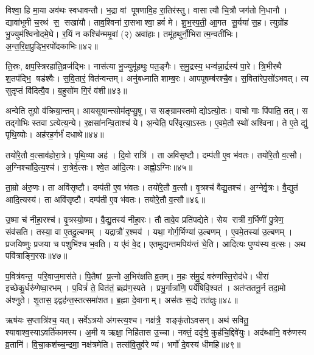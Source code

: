 विश्वा॒ हि मा॒या अव॑थः स्वधावन्तौ। 
भ॒द्रा वां पूषणावि॒ह रा॒तिर॑स्तु। वासात्यौ चि॒त्रौ जग॑तो नि॒धानौ। 
द्यावा॑भूमी च॒रथ॑ स॒ सखा॑यौ। ताव॒श्विना॑ रा॒सभाश्वा॒ हवं॑ मे। 
शु॒भ॒स्प॒ती॒ आ॒गत सू॒र्यया॑ स॒ह। त्युग्रो॑ह भु॒ज्युम॑श्विनोदमे॒घे। 
र॒यिं न कश्चि॑न्ममृ॒वां (२) अवा॑हाः। तमू॑हथुर्नौ॒भिरात्म॒न्वती॑भिः। 
अ॒न्त॒रि॒क्ष॒प्रुड्भि॒रपो॑दकाभिः॥४२॥


ति॒स्रः, क्षप॒स्त्रिरहा॑ति॒व्रज॑द्भिः। नास॑त्या भु॒ज्युमू॑हथुः पत॒ङ्गैः। 
स॒मु॒द्रस्य॒ धन्व॑न्ना॒र्द्रस्य॑ पा॒रे। त्रि॒भीरथै श॒तप॑द्भि॒ षड॑श्वैः। 
स॒वि॒तारं॒ वित॑न्वन्तम्‌। अनु॑बध्नाति शाम्ब॒रः। आपपू\ur{}षम्ब॑रश्चै॒व। 
स॒विता॑रेप॒सो॑ऽभवत्‌। त्य सुतृप्तं वि॑दित्वै॒व। ब॒हुसो॑म गि॒रं व॑शी॥४३॥

अन्वेति तुग्रो व॑क्रिया॒न्तम्‌। आयसूयान्त्सोम॑तृप्सु॒षु। स \linebreak सङ्ग्रामस्तमोद्योऽत्यो॒तः। 
वाचो गाः पि॑पाति॒ तत्‌। स तद्गोभिः स्तवाऽत्येत्य॒न्ये। र॒क्षसा॑नन्वि॒ताश्च॑ ये। 
अ॒न्वेति॒ परि॑वृत्या॒ऽस्तः। ए॒वमे॒तौ स्थो॑ अश्विना। 
ते ए॒ते द्यु॑ पृथि॒व्योः। अह॑रह॒र्गर्भं॑ दधाथे॥४४॥

तयो॑रे॒तौ व॒त्साव॑होरा॒त्रे। पृ॒थि॒व्या अह॑। दि॒वो रात्रि॑। 
ता अवि॑सृष्टौ। दम्प॑ती ए॒व भ॑वतः। तयो॑रे॒तौ व॒त्सौ। 
अ॒ग्निश्चा॑दि॒त्य॒श्च॑। रा॒त्रेर्व॒त्सः। श्वे॒त आ॑दि॒त्यः। अह्नो॒ऽग्निः॥४५॥

ता॒म्रो अ॑रु॒णः। ता अवि॑सृष्टौ। दम्प॑ती ए॒व भ॑वतः। 
तयो॑रे॒तौ व॒त्सौ। वृ॒त्रश्च॑ वैद्यु॒तश्च॑। अ॒ग्नेर्वृ॒त्रः। वै॒द्युत॑ आदि॒त्यस्य॑। 
ता अवि॑सृष्टौ। दम्प॑ती ए॒व भ॑वतः। तयो॑रे॒तौ व॒त्सौ॥४६॥


उ॒ष्मा च॑ नीहा॒रश्च॑। वृ॒त्रस्यो॒ष्मा। वै॒द्यु॒तस्य॑ नीहा॒रः। 
तौ तावे॒व प्रति॑पद्येते। सेय रात्री॑ ग॒र्भिणी॑ पु॒त्रेण॒ संव॑सति। 
तस्या॒ वा ए॒तदु॒ल्बणम्‌। यद्रात्रौ॑ र॒श्मय॑। 
यथा॒ गोर्ग॒र्भिण्या॑ उ॒ल्बणम्‌। ए॒वमे॒तस्या॑ उ॒ल्बणम्‌। 
प्रजयिष्णुः प्रजया च पशुभि॑श्च भ॒वति। 
य ए॑वं वे॒द। एतमुद्यन्तमपिय॑न्तं चे॒ति। 
आदित्यः पुण्य॑स्य व॒त्सः। अथ पवि॑त्राङ्गि॒रसः॥४७॥\anuvakamend


प॒वित्र॑वन्त॒ परि॒वाज॒मास॑ते। पि॒तैषां प्र॒त्नो अ॒भिर॑क्षति व्र॒तम्‌। 
म॒हः स॑मु॒द्रं वरु॑णस्ति॒रोद॑धे। धीरा॑ इच्छेकु॒र्धरु॑णेष्वा॒रभम्‌। 
प॒वित्रं॑ ते॒ वित॑तं॒ ब्रह्म॑ण॒स्पते। प्रभु॒र्गात्रा॑णि॒ पर्ये॑षिवि॒श्वत॑। 
अत॑प्ततनू॒र्न तदा॒मो अ॑श्नुते। शृ॒तास॒ इद्वह॑न्त॒स्तत्समा॑शत। 
ब्र॒ह्मा दे॒वानाम्‌। अस॑तः स॒द्ये तत॑क्षुः॥४८॥


ऋष॑यः स॒प्तात्रि॑श्च॒ यत्‌। सर्वेऽत्रयो अ॑गस्त्य॒श्च। 
नक्ष॑त्रै॒ शङ्कृ॑तोऽवसन्‌। अथ॑ सवितु॒ श्यावाश्व॒स्याऽवर्ति॑कामस्य। 
अ॒मी य ऋक्षा॒ निहि॑तास उ॒च्चा। नक्तं॒ ददृ॑श्रे॒ कुह॑चि॒द्दिवे॑युः। 
अद॑ब्धानि॒ वरु॑णस्य व्र॒तानि॑। वि॒चा॒कश॑च्च॒न्द्रमा॒ नक्ष॑त्रमेति। 
तत्स॑वि॒तुर्वरेण्यं। भर्गो॑ दे॒वस्य॑ धीमहि॥४९॥


